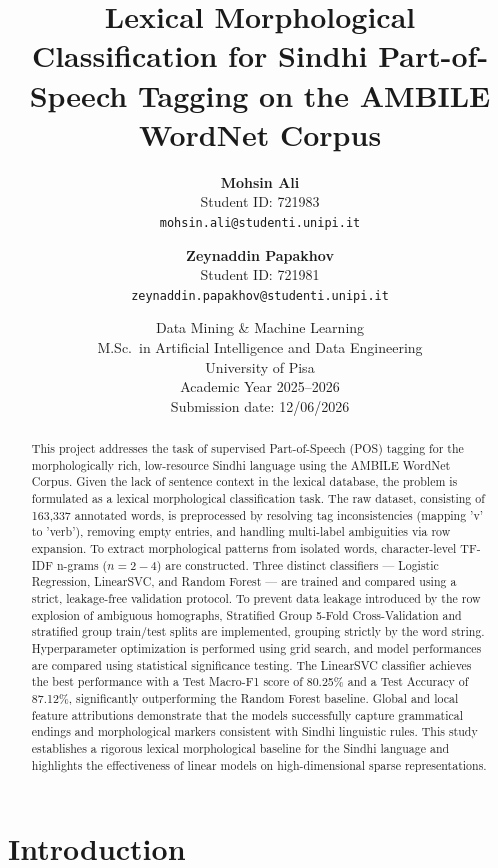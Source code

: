 \documentclass[12pt,a4paper]{article}
\title{\textbf{Lexical Morphological Classification for Sindhi Part-of-Speech Tagging on the AMBILE WordNet Corpus}}
\author{
  \textbf{Mohsin Ali} \\
  Student ID: 721983 \\
  \texttt{mohsin.ali@studenti.unipi.it}
  \and
  \textbf{Zeynaddin Papakhov} \\
  Student ID: 721981 \\
  \texttt{zeynaddin.papakhov@studenti.unipi.it}
}
\date{
  \vspace{1cm}
  \small
  Data Mining \& Machine Learning \\
  M.Sc.\ in Artificial Intelligence and Data Engineering \\
  University of Pisa \\
  Academic Year 2025--2026 \\
  \vspace{1.5cm}
  Submission date: 12/06/2026
}
\begin{document}
\maketitle
\thispagestyle{empty}
\newpage

\begin{abstract}
This project addresses the task of supervised Part-of-Speech (POS) tagging for the morphologically rich, low-resource Sindhi language using the AMBILE WordNet Corpus. Given the lack of sentence context in the lexical database, the problem is formulated as a lexical morphological classification task. The raw dataset, consisting of 163,337 annotated words, is preprocessed by resolving tag inconsistencies (mapping 'v' to 'verb'), removing empty entries, and handling multi-label ambiguities via row expansion. To extract morphological patterns from isolated words, character-level TF-IDF n-grams ($n=2-4$) are constructed. Three distinct classifiers --- Logistic Regression, LinearSVC, and Random Forest --- are trained and compared using a strict, leakage-free validation protocol. To prevent data leakage introduced by the row explosion of ambiguous homographs, Stratified Group 5-Fold Cross-Validation and stratified group train/test splits are implemented, grouping strictly by the word string. Hyperparameter optimization is performed using grid search, and model performances are compared using statistical significance testing. The LinearSVC classifier achieves the best performance with a Test Macro-F1 score of 80.25\% and a Test Accuracy of 87.12\%, significantly outperforming the Random Forest baseline. Global and local feature attributions demonstrate that the models successfully capture grammatical endings and morphological markers consistent with Sindhi linguistic rules. This study establishes a rigorous lexical morphological baseline for the Sindhi language and highlights the effectiveness of linear models on high-dimensional sparse representations.
\end{abstract}
\newpage

\tableofcontents
\newpage

\section{Introduction}
\end{document}
